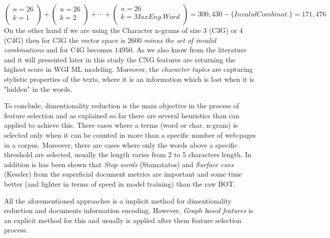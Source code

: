 \begin{equation}\label{chap:relevant_work:eq:en_vocab_size_calc}
	 \left(
    	\begin{array}{c}
        	n = 26\\
            k = 1\\
         \end{array}
	\right)
    +
    \left(
    	\begin{array}{c}
        	n = 26\\
            k = 2\\
         \end{array}
	\right) 
    +
     \cdots 
    +
   \left(
    	\begin{array}{c}
        	n = 26\\
            k = Max Eng. Word\\
         \end{array}
	\right) 
    = 300,430 - \{Invalid Combinat.\} =  171,476
\end{equation}
On the other hand if we are using the Character n-grams of size $3$ (C3G) or $4$ (C4G) then for C3G the vector space is $2600$ \textit{minus the set of invalid combinations} and for C4G becomes $14950$. As we also know from the literature and it will presented later in this study the CNG features are returning the highest score in WGI ML modeling. Moreover, the \textit{character tuples} are capturing stylistic properties of the texts, where it is an information which is lost when it is "hidden" in the words.

To conclude, dimentionality reduction is the main objective in the process of feature selection and as explained so far there are several heuristics than can applied to achieve this. There cases where a terms (word or char, n-gram) is selected only when it can be counted in more than a specific number of web-pages in a corpus. Moreover, there are cases where only the words above a specific threshold are selected, usually the length varies from 2 to 5 characters length. In addition is has been shown that \textit{Stop words} (Stamatatos) and 
\textit{Surface cues} (Kessler) from the superficial document metrics are important and some time better (and lighter in terms of speed in model training) than the raw BOT. 

All the aforementioned approaches is a implicit method for dimentionality reduction and documents information encoding. However, \textit{Graph based features} is an explicit method for this and usually is applied after them feature selection process.

